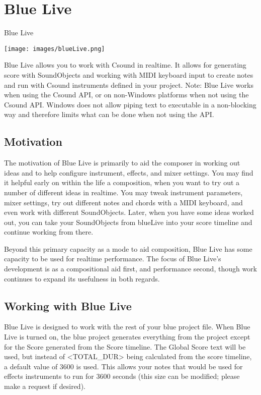\section{Blue Live}\label{blueLive}

Blue Live

\texttt{[image: images/blueLive.png]}

Blue Live allows you to work with Csound in realtime. It allows for
generating score with SoundObjects and working with MIDI keyboard input
to create notes and run with Csound instruments defined in your project.
Note: Blue Live works when using the Csound API, or on non-Windows
platforms when not using the Csound API. Windows does not allow piping
text to executable in a non-blocking way and therefore limits what can
be done when not using the API.

\subsection{Motivation}

The motivation of Blue Live is primarily to aid the composer in working
out ideas and to help configure instrument, effects, and mixer settings.
You may find it helpful early on within the life a composition, when you
want to try out a number of different ideas in realtime. You may tweak
instrument parameters, mixer settings, try out different notes and
chords with a MIDI keyboard, and even work with different SoundObjects.
Later, when you have some ideas worked out, you can take your
SoundObjects from blueLive into your score timeline and continue working
from there.

Beyond this primary capacity as a mode to aid composition, Blue Live has
some capacity to be used for realtime performance. The focus of Blue
Live's development is as a compositional aid first, and performance
second, though work continues to expand its usefulness in both regards.

\subsection{Working with Blue Live}

Blue Live is designed to work with the rest of your blue project file.
When Blue Live is turned on, the blue project generates everything from
the project except for the Score generated from the Score timeline. The
Global Score text will be used, but instead of
\textless{}TOTAL\_DUR\textgreater{} being calculated from the score
timeline, a default value of 3600 is used. This allows your notes that
would be used for effects instruments to run for 3600 seconds (this size
can be modified; please make a request if desired).

